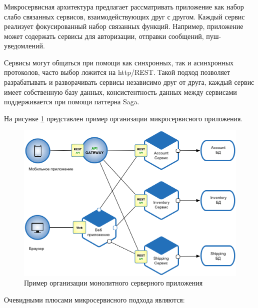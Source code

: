 \subsubsection {}
\label{sec:analysis:research:backArch:microservices}

Микросервисная архитектура предлагает рассматривать приложение как набор слабо связанных сервисов, взаимодействующих друг с другом. Каждый сервис реализует фокусированный набор связанных функций. Например, приложение может содержать сервисы для авторизации, отправки сообщений, пуш-уведомлений.

Сервисы могут общаться при помощи как синхронных, так и асинхронных протоколов, часто выбор ложится на \gls{http}/REST. Такой подход позволяет разрабатывать и разворачивать сервисы независимо друг от друга, каждый сервис имеет собственную базу данных, консистентность данных между сервисами поддерживается при помощи паттерна Saga\cite{microservices:ms}.

На рисунке \ref{sec:analysis:research:arch:back:micro} представлен пример организации микросервисного приложения.

\begin{figure}[h]
  \centering
    \includegraphics[width=1\textwidth]{inc/img/backend-micro.png}
  \caption{Пример организации монолитного серверного приложения}
  \label{sec:analysis:research:arch:back:micro}
\end{figure}

Очевидными плюсами микросервисного подхода являются:

